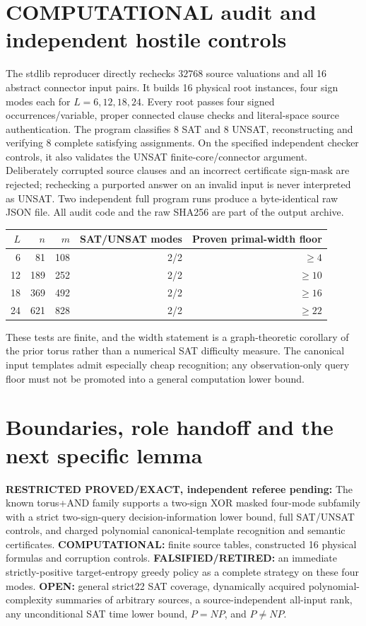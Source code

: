 \documentclass[11pt]{article}
\begin{document}
\section{COMPUTATIONAL audit and independent hostile controls}
The stdlib reproducer directly rechecks $32768$ source valuations and all 16 abstract connector input pairs. It builds 16 physical root instances, four sign modes each for $L=6,12,18,24$. Every root passes four signed occurrences/variable, proper connected clause checks and literal-space source authentication. The program classifies 8 SAT and 8 UNSAT, reconstructing and verifying 8 complete satisfying assignments. On the specified independent checker controls, it also validates the UNSAT finite-core/connector argument. Deliberately corrupted source clauses and an incorrect certificate sign-mask are rejected; rechecking a purported answer on an invalid input is never interpreted as UNSAT. Two independent full program runs produce a byte-identical raw JSON file. All audit code and the raw SHA256 are part of the output archive.

\begin{center}
\begin{tabular}{rrrrr}
\toprule
$L$ & $n$ & $m$ & SAT/UNSAT modes & Proven primal-width floor \\
\midrule
6 &81 &108 &2/2 &$\ge4$\\
12&189&252 &2/2 &$\ge10$\\
18&369&492 &2/2 &$\ge16$\\
24&621&828 &2/2 &$\ge22$\\
\bottomrule
\end{tabular}
\end{center}
These tests are finite, and the width statement is a graph-theoretic corollary of the prior torus rather than a numerical SAT difficulty measure. The canonical input templates admit especially cheap recognition; any observation-only query floor must not be promoted into a general computation lower bound.

\section{Boundaries, role handoff and the next specific lemma}
\textbf{RESTRICTED PROVED/EXACT, independent referee pending:} The known torus+AND family supports a two-sign XOR masked four-mode subfamily with a strict two-sign-query decision-information lower bound, full SAT/UNSAT controls, and charged polynomial canonical-template recognition and semantic certificates. \textbf{COMPUTATIONAL:} finite source tables, constructed 16 physical formulas and corruption controls. \textbf{FALSIFIED/RETIRED:} an immediate strictly-positive target-entropy greedy policy as a complete strategy on these four modes. \textbf{OPEN:} general strict22 SAT coverage, dynamically acquired polynomial-complexity summaries of arbitrary sources, a source-independent all-input rank, any unconditional SAT time lower bound, $P=NP$, and $P\ne NP$.
\end{document}
